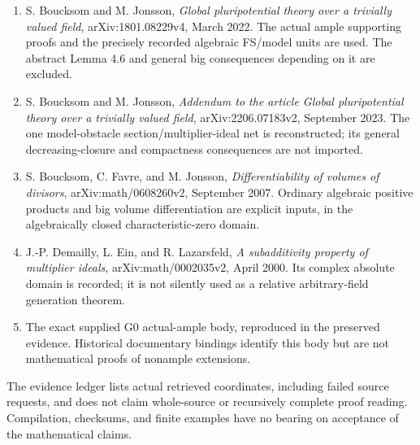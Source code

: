 \documentclass[
  10pt,
]{article}
\providecommand{\tightlist}{%
  \setlength{\itemsep}{0pt}\setlength{\parskip}{0pt}}
\begin{document}
\begin{enumerate}
\def\labelenumi{\arabic{enumi}.}
\tightlist
\item
  S. Boucksom and M. Jonsson, \emph{Global pluripotential theory over a
  trivially valued field}, arXiv:1801.08229v4, March 2022. The actual
  ample supporting proofs and the precisely recorded algebraic FS/model
  units are used. The abstract Lemma 4.6 and general big consequences
  depending on it are excluded.
\item
  S. Boucksom and M. Jonsson, \emph{Addendum to the article Global
  pluripotential theory over a trivially valued field},
  arXiv:2206.07183v2, September 2023. The one model-obstacle
  section/multiplier-ideal net is reconstructed; its general
  decreasing-closure and compactness consequences are not imported.
\item
  S. Boucksom, C. Favre, and M. Jonsson, \emph{Differentiability of
  volumes of divisors}, arXiv:math/0608260v2, September 2007. Ordinary
  algebraic positive products and big volume differentiation are
  explicit inputs, in the algebraically closed characteristic-zero
  domain.
\item
  J.-P. Demailly, L. Ein, and R. Lazarsfeld, \emph{A subadditivity
  property of multiplier ideals}, arXiv:math/0002035v2, April 2000. Its
  complex absolute domain is recorded; it is not silently used as a
  relative arbitrary-field generation theorem.
\item
  The exact supplied G0 actual-ample body, reproduced in the preserved
  evidence. Historical documentary bindings identify this body but are
  not mathematical proofs of nonample extensions.
\end{enumerate}

The evidence ledger lists actual retrieved coordinates, including failed
source requests, and does not claim whole-source or recursively complete
proof reading. Compilation, checksums, and finite examples have no
bearing on acceptance of the mathematical claims.
\end{document}
